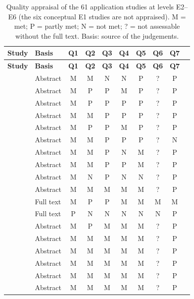 \documentclass[10pt,a4paper]{article}
\begin{document}
\begin{longtable}{@{}P{5.2cm}P{1.6cm}cccccccc@{}}
\caption{Quality appraisal of the 61 application studies at levels E2--E6 (the six conceptual E1 studies are not appraised). M = met; P = partly met; N = not met; ? = not assessable without the full text. Basis: source of the judgements.}\label{tab:S5}\\
\toprule \textbf{Study} & \textbf{Basis} & \textbf{Q1} & \textbf{Q2} & \textbf{Q3} & \textbf{Q4} & \textbf{Q5} & \textbf{Q6} & \textbf{Q7} \\ \midrule \endfirsthead
\toprule \textbf{Study} & \textbf{Basis} & \textbf{Q1} & \textbf{Q2} & \textbf{Q3} & \textbf{Q4} & \textbf{Q5} & \textbf{Q6} & \textbf{Q7} \\ \midrule \endhead
\bottomrule \endfoot

\citet{Moreira2014} & Abstract & M & M & N & N & P & ? & P \\
\citet{Moreira2016} & Abstract & M & P & P & M & P & ? & P \\
\citet{Moreira2017a} & Abstract & M & P & P & P & P & ? & P \\
\citet{Moreira2020b} & Abstract & M & M & P & P & P & ? & P \\
\citet{Wichert2020} & Abstract & M & P & P & M & P & ? & P \\
\citet{She2021} & Abstract & M & M & P & P & P & ? & N \\
\citet{Meghdadi2022} & Abstract & M & M & P & N & M & ? & P \\
\citet{Gao2025} & Abstract & M & M & P & P & M & ? & P \\
\citet{Widdows2003} & Abstract & M & N & P & N & N & ? & P \\
\citet{Sordoni2013} & Abstract & M & M & M & M & M & ? & P \\
\citet{Lorenz2023} & Full text & M & P & P & M & M & M & M \\
\citet{Svozil2025} & Full text & P & N & N & N & N & N & P \\
\citet{Stoudenmire2016} & Abstract & M & P & M & M & M & ? & P \\
\citet{Zhang2018} & Abstract & M & M & M & M & M & ? & P \\
\citet{Li2019} & Abstract & M & M & M & M & M & ? & P \\
\citet{Li2021a} & Abstract & M & M & M & M & M & ? & P \\
\citet{Li2021b} & Abstract & M & M & M & M & M & ? & P \\
\citet{Gkoumas2021} & Abstract & M & M & M & M & M & ? & P \\

\end{longtable}
\end{document}
